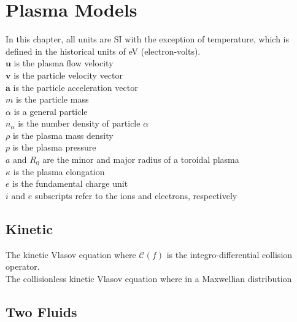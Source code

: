 \chapter{Plasma Models}
In this chapter, all units are SI with the exception of temperature,
which is defined in the historical units of eV (electron-volts).\\

\noindent
$\textbf{u}$ is the plasma flow velocity\\
$\mathbf{v}$ is the particle velocity vector\\
$\mathbf{a}$ is the particle acceleration vector\\
$m$ is the particle mass\\
$\alpha$ is a general particle\\
$n_{\alpha}$ is the number density of particle $\alpha$\\
$\rho$ is the plasma mass density\\
$p$ is the plasma pressure\\
$a$ and $R_0$ are the minor and major radius of a toroidal plasma\\
$\kappa$ is the plasma elongation\\
$e$ is the fundamental charge unit\\
$i$ and $e$ subscripts refer to the ions and electrons, respectively\\
\section{Kinetic}

\noindent
The kinetic Vlasov equation
\indent where $\mathcal{C}(f)$ is the integro-differential collision operator.\\

\noindent
The collisionless kinetic Vlasov equation 
\indent where in a Maxwellian distribution

\section{Two Fluids}

